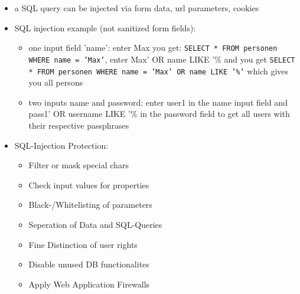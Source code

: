 \documentclass[11pt]{article}
\begin{document}
\begin{itemize}
\item a SQL query can be injected via form data, url parameters, cookies
\item SQL injection example (not sanitized form fields):
\begin{itemize}
\item one input field 'name': enter Max you get: \texttt{SELECT * FROM personen WHERE name = 'Max'}, enter Max' OR name LIKE '\% and you get \texttt{SELECT * FROM personen WHERE name = 'Max' OR name LIKE '\%'} which gives you all persons
\item two inputs name and password: enter user1 in the name input field and pass1' OR username LIKE '\% in the password field to get all users with their respective passphrases
\end{itemize}
\item SQL-Injection Protection:
\begin{itemize}
\item Filter or mask special chars
\item Check input values for properties
\item Black-/Whitelisting of parameters
\item Seperation of Data and SQL-Queries
\item Fine Distinction of user rights
\item Disable unused DB functionalites
\item Apply Web Application Firewalls
\end{itemize}
\end{itemize}
\end{document}
